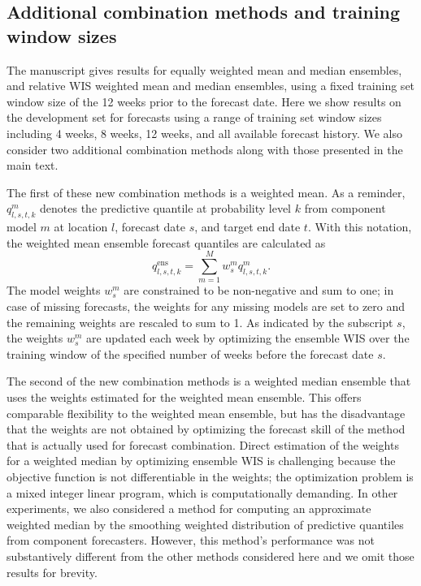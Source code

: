 \documentclass{article}
\begin{document}
\subsection{Additional combination methods and training window sizes}

The manuscript gives results for equally weighted mean and median ensembles, and relative WIS weighted mean and median ensembles, using a fixed training set window size of the 12 weeks prior to the forecast date. Here we show results on the development set for forecasts using a range of training set window sizes including 4 weeks, 8 weeks, 12 weeks, and all available forecast history. We also consider two additional combination methods along with those presented in the main text.

The first of these new combination methods is a weighted mean. As a reminder,  $q^m_{l,s,t,k}$ denotes the predictive quantile at probability level $k$ from component model $m$ at location $l$, forecast date $s$, and target end date $t$. With this notation, the weighted mean ensemble forecast quantiles are calculated as
$$q^\text{ens}_{l,s,t,k} = \sum_{m = 1}^M w^m_{s} q^{m}_{l,s,t,k}.$$
The model weights $w^m_s$ are constrained to be non-negative and sum to one; in case of missing forecasts, the weights for any missing models are set to zero and the remaining weights are rescaled to sum to 1.
As indicated by the subscript $s$, the weights $w^m_s$ are updated each week by optimizing the ensemble WIS over the training window of the specified number of weeks before the forecast date $s$.

The second of the new combination methods is a weighted median ensemble that uses the weights estimated for the weighted mean ensemble. This offers comparable flexibility to the weighted mean ensemble, but has the disadvantage that the weights are not obtained by optimizing the forecast skill of the method that is actually used for forecast combination. Direct estimation of the weights for a weighted median by optimizing ensemble WIS is challenging because the objective function is not differentiable in the weights; the optimization problem is a mixed integer linear program, which is computationally demanding. In other experiments, we also considered a method for computing an approximate weighted median by the smoothing weighted distribution of predictive quantiles from component forecasters. However, this method's performance was not substantively different from the other methods considered here and we omit those results for brevity.
\end{document}
